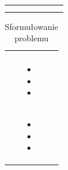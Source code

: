 \begin{minipage}{\textwidth}
\begin{table}[H]
\begin{center}
\begin{tabular}{|P{.22\textwidth}|P{.09\textwidth}|P{.09\textwidth}|P{.09\textwidth}|P{.09\textwidth}|P{.09\textwidth}|P{.09\textwidth}|}
                    &        &            &           &             &        &        \\ \hline
                    &        &            &           &             &        &      \\ \hline
                   &        &            &           &             &        &      \\ \hline
        \end{tabular}\end{center}
        \raggedright\source{\ownwork}
    \end{table}
\end{minipage}

\begin{minipage}{\textwidth}
    \begin{table}[H]
        \raggedright\caption{Sformułowanie problemu\label{tabela:sformulowanie-problemu}}
        \begin{center}\begin{tabular}{|P{.2\textwidth}|p{.7\textwidth}|}

            \hline
             &
             \\
            \hline

             &
             \\
            \hline

             &
            \begin{itemize}
                \item {}
                \item {}
                \item {}
            \end{itemize} \\
            \hline

             &
            \begin{itemize}
                \item {}
                \item {}
                \item {}
            \end{itemize} \\
            \hline
        \end{tabular}\end{center}
        \raggedright\source{\ownwork}
    \end{table}
\end{minipage}

